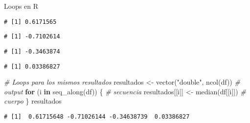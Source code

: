 \documentclass[
  8pt,
  ignorenonframetext,
]{beamer}
\newenvironment{Shaded}{\begin{snugshade}}{\end{snugshade}}
\newcommand{\CommentTok}[1]{\textcolor[rgb]{0.56,0.35,0.01}{\textit{#1}}}
\newcommand{\ControlFlowTok}[1]{\textcolor[rgb]{0.13,0.29,0.53}{\textbf{#1}}}
\newcommand{\FunctionTok}[1]{\textcolor[rgb]{0.00,0.00,0.00}{#1}}
\newcommand{\NormalTok}[1]{#1}
\newcommand{\OtherTok}[1]{\textcolor[rgb]{0.56,0.35,0.01}{#1}}
\newcommand{\SpecialCharTok}[1]{\textcolor[rgb]{0.00,0.00,0.00}{#1}}
\newcommand{\StringTok}[1]{\textcolor[rgb]{0.31,0.60,0.02}{#1}}
\begin{document}
\begin{frame}[fragile]{Loops en R}
\protect\hypertarget{loops-en-r-4}{}
\begin{Shaded}
\end{Shaded}

\begin{verbatim}
# [1] 0.6171565
\end{verbatim}

\begin{Shaded}
\end{Shaded}

\begin{verbatim}
# [1] -0.7102614
\end{verbatim}

\begin{Shaded}
\end{Shaded}

\begin{verbatim}
# [1] -0.3463874
\end{verbatim}

\begin{Shaded}
\end{Shaded}

\begin{verbatim}
# [1] 0.03386827
\end{verbatim}

\begin{Shaded}
\begin{Highlighting}[]
\CommentTok{\# Loops para los mismos resultados}
\NormalTok{resultados }\OtherTok{\textless{}{-}} \FunctionTok{vector}\NormalTok{(}\StringTok{"double"}\NormalTok{, }\FunctionTok{ncol}\NormalTok{(df))  }\CommentTok{\#  output}
\ControlFlowTok{for}\NormalTok{ (i }\ControlFlowTok{in} \FunctionTok{seq\_along}\NormalTok{(df)) \{            }\CommentTok{\#  secuencia}
\NormalTok{  resultados[[i]] }\OtherTok{\textless{}{-}} \FunctionTok{median}\NormalTok{(df[[i]])      }\CommentTok{\#  cuerpo}
\NormalTok{\}}
\NormalTok{resultados}
\end{Highlighting}
\end{Shaded}

\begin{verbatim}
# [1]  0.61715648 -0.71026144 -0.34638739  0.03386827
\end{verbatim}
\end{frame}
\end{document}
